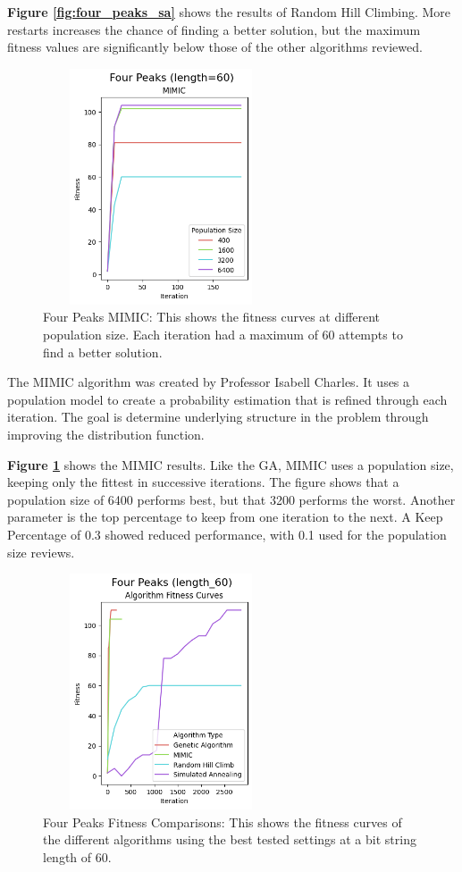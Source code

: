 \documentclass[letterpaper]{article} %
\begin{document}
\textbf{Figure \ref{fig:four_peaks_sa}}  shows the results of Random Hill Climbing.  More restarts increases the chance of finding a better solution, but the maximum fitness values are significantly below those of the other algorithms reviewed.

\begin{figure}[htb]
\centering
\includegraphics[width=2.75in, height=2.75in]{figures/Four_Peaks_length=60_MIMIC_l_60_ma_60_p_400__1600__3200__6400_k_0.1_.png}
\caption{Four Peaks MIMIC:  This shows the fitness curves at different population size. Each iteration had a maximum of 60 attempts to find a better solution. }
\label{fig:four_peaks_mimic}
\end{figure}

The MIMIC algorithm was created by Professor Isabell Charles.  It uses a population model to create a probability estimation that is refined through each iteration.  The goal is determine underlying structure in the problem through improving the distribution function.

\textbf{Figure \ref{fig:four_peaks_mimic}} shows the MIMIC results.  Like the GA, MIMIC uses a population size, keeping only the fittest in successive iterations.  The figure shows that a population size of 6400 performs best, but that 3200 performs the worst.  Another parameter is the top percentage to keep from one iteration to the next.  A Keep Percentage of 0.3 showed reduced performance, with 0.1 used for the population size reviews. 

\begin{figure}[htb]
\centering
\includegraphics[width=2.75in, height=2.75in]{figures/Four_Peaks_length_60_Algorithm_Fitness_Curves_.png}
\caption{Four Peaks Fitness Comparisons: This shows the fitness curves of the different algorithms using the best tested settings at a bit string length of 60.  }
\label{fig:four_peaks_fitness_comparison_60}
\end{figure}
\end{document}
